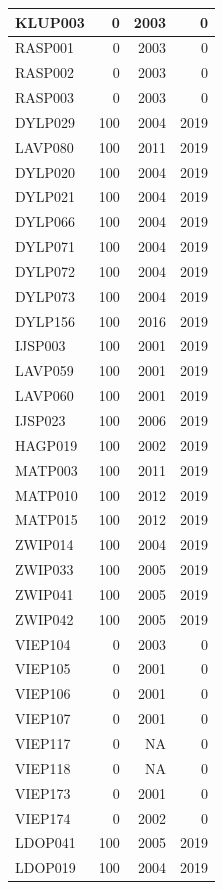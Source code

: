 \documentclass[11pt,]{book}
\begin{document}
\begin{table}
\begin{tabular}[t]{l|r|r|r}
KLUP003 & 0 & 2003 & 0\\
\hline
RASP001 & 0 & 2003 & 0\\
\hline
RASP002 & 0 & 2003 & 0\\
\hline
RASP003 & 0 & 2003 & 0\\
\hline
DYLP029 & 100 & 2004 & 2019\\
\hline
LAVP080 & 100 & 2011 & 2019\\
\hline
DYLP020 & 100 & 2004 & 2019\\
\hline
DYLP021 & 100 & 2004 & 2019\\
\hline
DYLP066 & 100 & 2004 & 2019\\
\hline
DYLP071 & 100 & 2004 & 2019\\
\hline
DYLP072 & 100 & 2004 & 2019\\
\hline
DYLP073 & 100 & 2004 & 2019\\
\hline
DYLP156 & 100 & 2016 & 2019\\
\hline
IJSP003 & 100 & 2001 & 2019\\
\hline
LAVP059 & 100 & 2001 & 2019\\
\hline
LAVP060 & 100 & 2001 & 2019\\
\hline
IJSP023 & 100 & 2006 & 2019\\
\hline
HAGP019 & 100 & 2002 & 2019\\
\hline
MATP003 & 100 & 2011 & 2019\\
\hline
MATP010 & 100 & 2012 & 2019\\
\hline
MATP015 & 100 & 2012 & 2019\\
\hline
ZWIP014 & 100 & 2004 & 2019\\
\hline
ZWIP033 & 100 & 2005 & 2019\\
\hline
ZWIP041 & 100 & 2005 & 2019\\
\hline
ZWIP042 & 100 & 2005 & 2019\\
\hline
VIEP104 & 0 & 2003 & 0\\
\hline
VIEP105 & 0 & 2001 & 0\\
\hline
VIEP106 & 0 & 2001 & 0\\
\hline
VIEP107 & 0 & 2001 & 0\\
\hline
VIEP117 & 0 & NA & 0\\
\hline
VIEP118 & 0 & NA & 0\\
\hline
VIEP173 & 0 & 2001 & 0\\
\hline
VIEP174 & 0 & 2002 & 0\\
\hline
LDOP041 & 100 & 2005 & 2019\\
\hline
LDOP019 & 100 & 2004 & 2019\\

\end{tabular}
\end{table}
\end{document}
